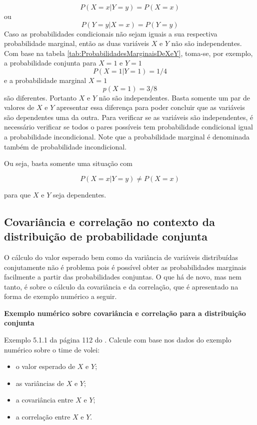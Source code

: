 \documentclass[
]{book}
\providecommand{\tightlist}{%
  \setlength{\itemsep}{0pt}\setlength{\parskip}{0pt}}
\begin{document}
\[
P(X=x|Y=y) = P(X=x)
\]
ou
\[
P(Y=y|X=x) = P(Y=y)
\]
Caso as probabilidades condicionais não sejam iguais a sua respectiva probabilidade marginal, então as duas variáveis \(X\) e \(Y\) não são independentes. Com base na tabela \ref{tab:ProbabilidadesMarginaisDeXeY}, toma-se, por exemplo,
a probabilidade conjunta para \(X=1\) e \(Y=1\)
\[
  P(X=1|Y=1) =1/4
\]
e a probabilidade marginal \(X=1\)
\[
  p(X=1) = 3/8
\]
são diferentes. Portanto \(X\) e \(Y\) não são independentes. Basta somente um par de valores de \(X\) e \(Y\) apresentar essa diferença para poder concluir que as variáveis são dependentes uma da outra. Para verificar se as variáveis são independentes, é necessário verificar se todos o pares possíveis tem probabilidade condicional igual a probabilidade incondicional. Note que a probabilidade marginal é denominada também de probabilidade incondicional.

Ou seja, basta somente uma situação com

\[
  P(X=x | Y=y) \neq P(X=x)
\]

para que \(X\) e \(Y\) seja dependentes.

\hypertarget{covariuxe2ncia-e-correlauxe7uxe3o-no-contexto-da-distribuiuxe7uxe3o-de-probabilidade-conjunta}{%
\subsection{Covariância e correlação no contexto da distribuição de probabilidade conjunta}\label{covariuxe2ncia-e-correlauxe7uxe3o-no-contexto-da-distribuiuxe7uxe3o-de-probabilidade-conjunta}}

O cálculo do valor esperado bem como da variância de variáveis distribuídas conjutamente não é problema pois é possível obter as probabilidades marginais facilmente a partir das probabilidades conjuntas. O que há de novo, mas nem tanto, é sobre o cálculo da covariância e da correlação, que é apresentado na forma de exemplo numérico a seguir.

\textbf{Exemplo numérico sobre covariância e correlação para a distribuição conjunta}

Exemplo 5.1.1 da página 112 do \citet{Sartoris2013}. Calcule com base nos dados do exemplo numérico sobre o time de volei:

\begin{itemize}
\tightlist
\item
  o valor esperado de \(X\) e \(Y\);
\item
  as variâncias de \(X\) e \(Y\);
\item
  a covariância entre \(X\) e \(Y\);
\item
  a correlação entre \(X\) e \(Y\).
\end{itemize}
\end{document}
